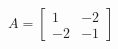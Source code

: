 \documentclass[preview]{standalone}
\begin{document}
\begin{align*}
A = \left[\begin{matrix}1 & -2\\-2 & -1\end{matrix}\right]
\end{align*}
\end{document}
